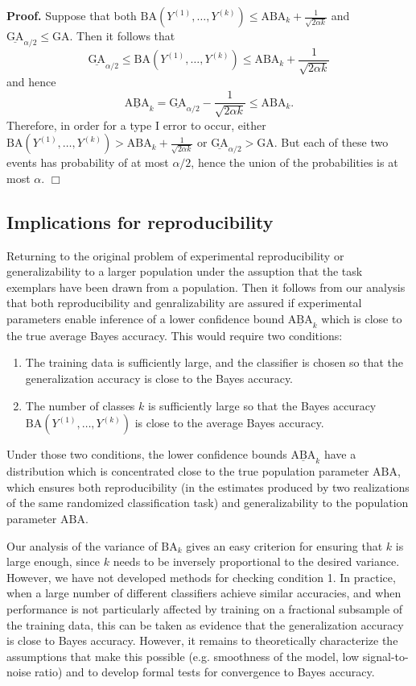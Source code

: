 \textbf{Proof.}
Suppose that both $\text{BA}(Y^{(1)},\hdots,
Y^{(k)}) \leq \text{ABA}_k + \frac{1}{\sqrt{2\alpha k}}$ and
$\underline{\text{GA}}_{\alpha/2} \leq \text{GA}.$
Then it follows that
\[
\underline{\text{GA}}_{\alpha/2} \leq \text{BA}(Y^{(1)},\hdots,
Y^{(k)}) \leq \text{ABA}_k + \frac{1}{\sqrt{2\alpha k}}
\]
and hence
\[
\underline{\text{ABA}}_k = \underline{\text{GA}}_{\alpha/2} -  \frac{1}{\sqrt{2\alpha k}} \leq \text{ABA}_k.
\]
Therefore, in order for a type I error to occur, either
$\text{BA}(Y^{(1)},\hdots, Y^{(k)}) > \text{ABA}_k
+ \frac{1}{\sqrt{2\alpha k}}$ or $\underline{\text{GA}}_{\alpha/2}
> \text{GA}.$ But each of these two events has probability of at most
$\alpha/2$, hence the union of the probabilities is at most
$\alpha$. $\Box$

\subsection{Implications for reproducibility}

Returning to the original problem of experimental reproducibility or
generalizability to a larger population under the assuption that the
task exemplars have been drawn from a population.  Then it follows
from our analysis that both reproducibility and genralizability are
assured if experimental parameters enable inference of a lower
confidence bound $\underline{\text{ABA}}_k$ which is close to the true
average Bayes accuracy.  This would require two conditions:
\begin{enumerate}
\item The training data is sufficiently large, and the classifier is
  chosen so that the generalization accuracy is close to the Bayes
  accuracy.
\item The number of classes $k$ is sufficiently large so that the
  Bayes accuracy $\text{BA}(Y^{(1)},\hdots, Y^{(k)})$ is close to the
  average Bayes accuracy.
\end{enumerate}
Under those two conditions, the lower confidence bounds
$\underline{\text{ABA}}_k$ have a distribution which is concentrated
close to the true population parameter $\text{ABA}$, which ensures
both reproducibility (in the estimates produced by two realizations of
the same randomized classification task) and generalizability to the
population parameter $\text{ABA}$.

Our analysis of the variance of $\text{BA}_k$ gives an easy criterion
for ensuring that $k$ is large enough, since $k$ needs to be inversely
proportional to the desired variance.  However, we have not developed
methods for checking condition 1.  In practice, when a large number of
different classifiers achieve similar accuracies, and when performance
is not particularly affected by training on a fractional subsample of
the training data, this can be taken as evidence that the
generalization accuracy is close to Bayes accuracy.  However, it
remains to theoretically characterize the assumptions that make this
possible (e.g. smoothness of the model, low signal-to-noise ratio) and
to develop formal tests for convergence to Bayes accuracy.

